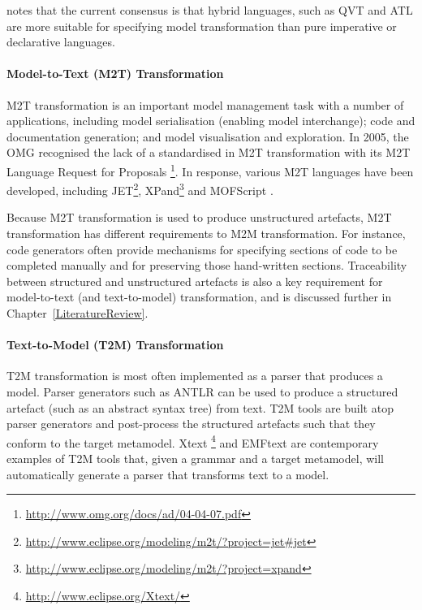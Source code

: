 \cite{kolovos08etl} notes that the current consensus is that hybrid languages, such as QVT \cite{qvt} and ATL \cite{jouault05transforming} are more suitable for specifying model transformation than pure imperative or declarative languages. 

\paragraph{Model-to-Text (M2T) Transformation} M2T transformation is an important model management task with a number of applications, including model serialisation (enabling model interchange); code and documentation generation; and model visualisation and exploration.  In 2005, the OMG \cite{omg} recognised the lack of a standardised in M2T transformation with its M2T Language Request for Proposals \footnote{\url{http://www.omg.org/docs/ad/04-04-07.pdf}}. In response, various M2T languages have been developed, including JET\footnote{\url{http://www.eclipse.org/modeling/m2t/?project=jet#jet}}, XPand\footnote{\url{http://www.eclipse.org/modeling/m2t/?project=xpand}} 
and MOFScript \cite{oldevik05toward}.

Because M2T transformation is used to produce unstructured artefacts, M2T transformation has different requirements to M2M transformation. For instance, code generators often provide mechanisms for specifying sections of code to be completed manually and for preserving those hand-written sections. Traceability between structured and unstructured artefacts is also a key requirement for model-to-text (and text-to-model) transformation, and is discussed further in Chapter~\ref{LiteratureReview}.

\paragraph{Text-to-Model (T2M) Transformation} T2M transformation is most often implemented as a parser that produces a model. Parser generators such as ANTLR \cite{parr07antlr} can be used to produce a structured artefact (such as an abstract syntax tree) from text. T2M tools are built atop parser generators and post-process the structured artefacts such that they conform to the target metamodel. Xtext \footnote{\url{http://www.eclipse.org/Xtext/}} and EMFtext \cite{heidenreich09derivation} are contemporary examples of T2M tools that, given a grammar and a target metamodel, will automatically generate a parser that transforms text to a model.

